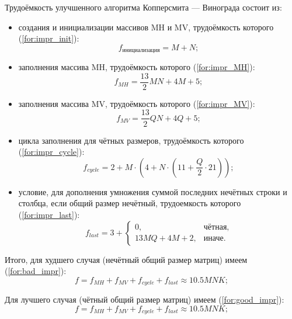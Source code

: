 Трудоёмкость улучшенного алгоритма Копперсмита — Винограда состоит из:
\begin{itemize}
	\item создания и инициализации массивов MH и MV, трудоёмкость которого (\ref{for:impr_init}):
	\begin{equation}
		\label{for:impr_init}
		f_{инициализация} = M + N;
	\end{equation}
	
	\item заполнения массива MH, трудоёмкость которого (\ref{for:impr_MH}):
	\begin{equation}
		\label{for:impr_MH}
		f_{MH} =  \frac{13}{2}MN + 4M + 5;
	\end{equation}
	
	\item заполнения массива MV, трудоёмкость которого (\ref{for:impr_MV}):
	\begin{equation}
		\label{for:impr_MV}
		f_{MV} =  \frac{13}{2}QN + 4Q + 5;
	\end{equation}
	
	\item цикла заполнения для чётных размеров, трудоёмкость которого (\ref{for:impr_cycle}):
	\begin{equation}
		\label{for:impr_cycle}
		f_{cycle} =2 + M \cdot (4 + N \cdot (11 + \frac{Q}{2} \cdot 21));
	\end{equation}
	
	\item условие, для дополнения умножения суммой последних нечётных строки и столбца, если общий размер нечётный, трудоемкость которого (\ref{for:impr_last}):
	\begin{equation}
		\label{for:impr_last}
		f_{last} = 3 + 
		\begin{cases}
			0, & \text{чётная,}\\
			13MQ + 4M + 2, & \text{иначе.}
		\end{cases}
	\end{equation}
\end{itemize}

Итого, для худшего случая (нечётный общий размер матриц) имеем (\ref{for:bad_impr}):
\begin{equation}
	\label{for:bad_impr}
	f = f_{MH} + f_{MV} + f_{cycle} + f_{last} \approx 10.5MNK;
\end{equation}

Для лучшего случая (чётный общий размер матриц) имеем (\ref{for:good_impr}):
\begin{equation}
	\label{for:good_impr}
	f = f_{MH} + f_{MV} + f_{cycle} + f_{last} \approx 10.5MNK;
\end{equation}

